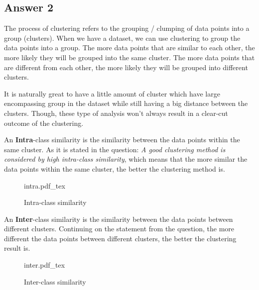 \documentclass[
  11pt, %
]{assignment}
\newcommand{\incfig}[1]{%
    \def\svgwidth{\columnwidth}
    {#1.pdf_tex}
}
\begin{document}
\subsection*{Answer 2}

The process of clustering refers to the grouping / clumping of data points into a group (clusters). When we have a dataset, we can use clustering to group the data points into a group. The more data points that are similar to each other, the more likely they will be grouped into the same cluster. The more data points that are different from each other, the more likely they will be grouped into different clusters.

It is naturally great to have a little amount of cluster which have large encompassing group in the dataset while still having a big distance between the clusters. Though, these type of analysis won't always result in a clear-cut outcome of the clustering.

An \textbf{Intra}-class similarity is the similarity between the data points within the same cluster. As it is stated in the question: \textit{A good clustering method is considered by high intra-class similarity}, which means that the more similar the data points within the same cluster, the better the clustering method is.

\begin{figure}[H]
	\centering
	\def\columnwidth{0.5\textwidth}
	\incfig{intra}
	\caption{Intra-class similarity}\label{fig:intra-class}
\end{figure}

An \textbf{Inter}-class similarity is the similarity between the data points between different clusters. Continuing on the statement from the question, the more different the data points between different clusters, the better the clustering result is.

\begin{figure}[H]
	\centering
	\def\columnwidth{0.9\textwidth}
	\incfig{inter}
	\caption{Inter-class similarity}\label{fig:inter-class}
\end{figure}
\end{document}

